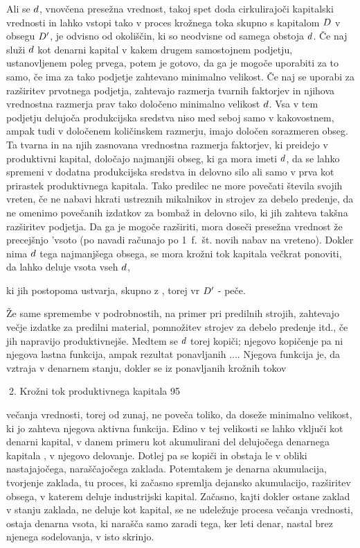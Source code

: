\documentclass[kapital_02.tex]{subfiles}
\begin{document}
Ali se \( d \), vnovčena presežna vrednost, takoj spet doda cirkulirajoči kapitalski vrednosti in lahko vstopi tako v proces krožnega toka skupno s kapitalom \( D \) v obsegu \( D' \), je odvisno od okoliščin, ki so neodvisne od samega obstoja \( d \). Če naj služi \( d \) kot denarni kapital v kakem drugem samostojnem podjetju, ustanovljenem poleg prvega, potem je gotovo, da ga je mogoče uporabiti za to samo, če ima za tako podjetje zahtevano minimalno velikost. Če naj se uporabi za razširitev prvotnega podjetja, zahtevajo razmerja tvarnih faktorjev in njihova vrednostna razmerja prav tako določeno minimalno velikost \( d \). Vsa v tem podjetju delujoča produkcijska sredstva niso med seboj samo v kakovostnem, ampak tudi v določenem količinskem razmerju, imajo določen sorazmeren obseg. Ta tvarna in na njih zasnovana vrednostna razmerja faktorjev, ki preidejo v produktivni kapital, določajo najmanjši obseg, ki ga mora imeti \( d \), da se lahko spremeni v dodatna produkcijska sredstva in delovno silo ali samo v prva kot prirastek produktivnega kapitala. Tako predilec ne more povečati števila svojih vreten, če ne nabavi hkrati ustreznih mikalnikov in strojev za debelo predenje, da ne omenimo povečanih izdatkov za bombaž in delovno silo, ki jih zahteva takšna razširitev podjetja. Da ga je mogoče razširiti, mora doseči presežna vrednost že precejšnjo 'vsoto (po navadi računajo po 1~f.~št. novih nabav na vreteno). Dokler nima \( d \) tega najmanjšega obsega, se mora krožni tok kapitala večkrat ponoviti, da lahko deluje vsota vseh \( d \),

ki jih postopoma ustvarja, skupno z \KPED, torej vr \( D' \) - peče.

Že same spremembe v podrobnostih, na primer pri predilnih strojih, zahtevajo večje izdatke za predilni material, pomnožitev strojev za debelo predenje itd., če jih napravijo produktivnejše. Medtem se \( d \) torej kopiči; njegovo kopičenje pa ni njegova lastna funkcija, ampak rezultat ponavljanih \KPEP...\KPEP. Njegova funkcija je, da vztraja v denarnem stanju, dokler se iz ponavljanih krožnih tokov



2. Krožni tok produktivnega kapitala 95



 večanja vrednosti, torej od zunaj, ne poveča toliko, da doseže minimalno velikost, ki jo zahteva njegova aktivna funkcija. Edino v tej velikosti se lahko vključi kot denarni kapital, v danem primeru kot akumulirani del delujočega denarnega kapitala \KPED, v njegovo delovanje. Dotlej pa se kopiči in obstaja le v obliki nastajajočega, naraščajočega zaklada. Potemtakem je denarna akumulacija, tvorjenje zaklada, tu proces, ki začasno spremlja dejansko akumulacijo, razširitev obsega, v katerem deluje industrijski kapital. Začasno, kajti dokler ostane zaklad v stanju zaklada, ne deluje kot kapital, se ne udeležuje procesa večanja vrednosti, ostaja denarna vsota, ki narašča samo zaradi tega, ker leti denar, nastal brez njenega sodelovanja, v isto skrinjo.
\end{document}
